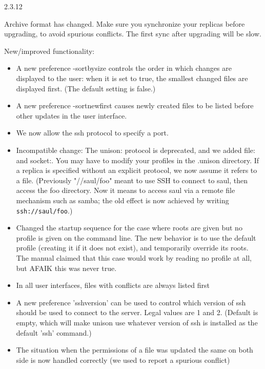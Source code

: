 \begin{changesfromversion}{2.3.12}
\item \incompatible{} Archive format has changed.  Make sure you
synchronize your replicas before upgrading, to avoid spurious
conflicts.  The first sync after upgrading will be slow.

\item New/improved functionality:
\begin{itemize}
\item  A new preference -sortbysize controls the order in which changes
  are displayed to the user: when it is set to true, the smallest
  changed files are displayed first.  (The default setting is false.)
\item A new preference -sortnewfirst causes newly created files to be
  listed before other updates in the user interface.
\item We now allow the ssh protocol to specify a port.
\item Incompatible change: The unison: protocol is deprecated, and we added
  file: and socket:.  You may have to modify your profiles in the
  .unison directory.
  If a replica is specified without an explicit protocol, we now
  assume it refers to a file.  (Previously "//saul/foo" meant to use
  SSH to connect to saul, then access the foo directory.  Now it means
  to access saul via a remote file mechanism such as samba; the old
  effect is now achieved by writing {\tt ssh://saul/foo}.)
\item Changed the startup sequence for the case where roots are given but
  no profile is given on the command line.  The new behavior is to
  use the default profile (creating it if it does not exist), and
  temporarily override its roots.  The manual claimed that this case
  would work by reading no profile at all, but AFAIK this was never
  true.
\item In all user interfaces, files with conflicts are always listed first
\item A new preference 'sshversion' can be used to control which version
  of ssh should be used to connect to the server.  Legal values are 1 and 2.
  (Default is empty, which will make unison use whatever version of ssh
  is installed as the default 'ssh' command.)
\item The situation when the permissions of a file was updated the same on
  both side is now handled correctly (we used to report a spurious conflict)

\end{itemize}


\end{changesfromversion}
